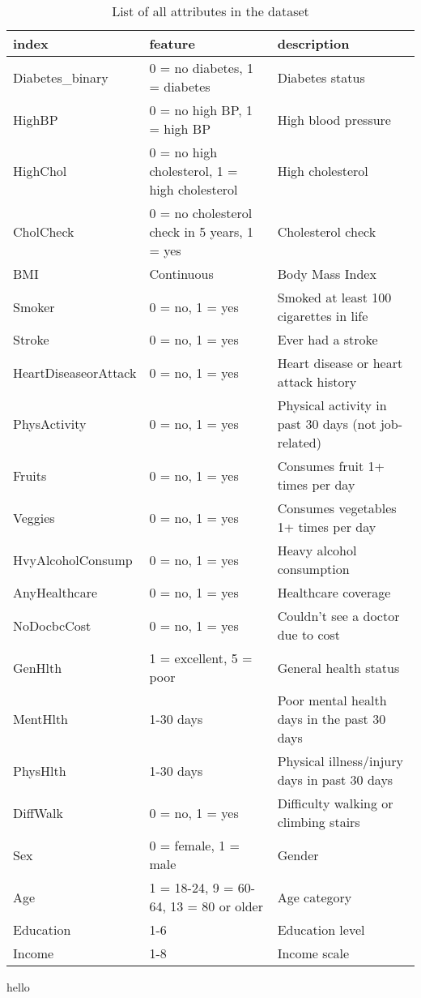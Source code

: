 \begin{table}[ht]
\centering
\begin{tabular}{|l|l|l|}
\hline
index & feature & description \\
\hline
Diabetes\_binary & 0 = no diabetes, 1 = diabetes & Diabetes status \\
\hline
HighBP & 0 = no high BP, 1 = high BP & High blood pressure \\
\hline
HighChol & 0 = no high cholesterol, 1 = high cholesterol & High cholesterol \\
\hline
CholCheck & 0 = no cholesterol check in 5 years, 1 = yes & Cholesterol check \\
\hline
BMI & Continuous & Body Mass Index \\
\hline
Smoker & 0 = no, 1 = yes & Smoked at least 100 cigarettes in life \\
\hline
Stroke & 0 = no, 1 = yes & Ever had a stroke \\
\hline
HeartDiseaseorAttack & 0 = no, 1 = yes & Heart disease or heart attack history \\
\hline
PhysActivity & 0 = no, 1 = yes & Physical activity in past 30 days (not job-related) \\
\hline
Fruits & 0 = no, 1 = yes & Consumes fruit 1+ times per day \\
\hline
Veggies & 0 = no, 1 = yes & Consumes vegetables 1+ times per day \\
\hline
HvyAlcoholConsump & 0 = no, 1 = yes & Heavy alcohol consumption \\
\hline
AnyHealthcare & 0 = no, 1 = yes & Healthcare coverage \\
\hline
NoDocbcCost & 0 = no, 1 = yes & Couldn’t see a doctor due to cost \\
\hline
GenHlth & 1 = excellent, 5 = poor & General health status \\
\hline
MentHlth & 1-30 days & Poor mental health days in the past 30 days \\
\hline
PhysHlth & 1-30 days & Physical illness/injury days in past 30 days \\
\hline
DiffWalk & 0 = no, 1 = yes & Difficulty walking or climbing stairs \\
\hline
Sex & 0 = female, 1 = male & Gender \\
\hline
Age & 1 = 18-24, 9 = 60-64, 13 = 80 or older & Age category \\
\hline
Education & 1-6 & Education level \\
\hline
Income & 1-8 & Income scale \\
\hline
\end{tabular}
\caption{List of all attributes in the dataset}
\end{table}
hello 

